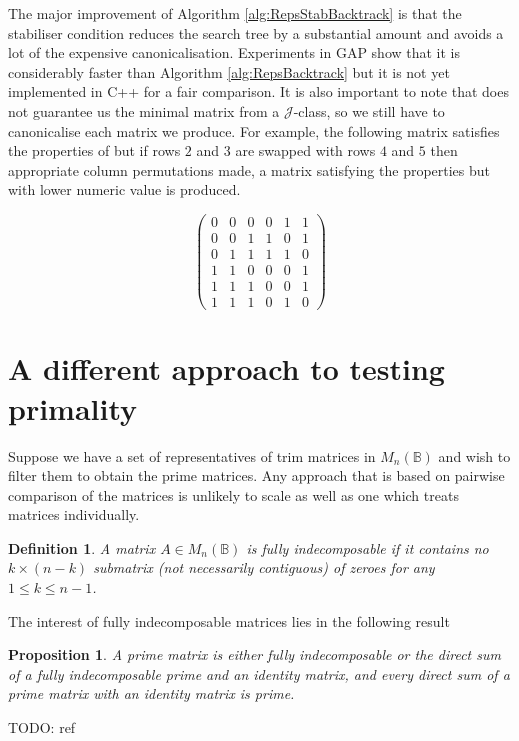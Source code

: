 \documentclass[11pt]{article}
\newtheorem{prop}[thm]{Proposition}
\newtheorem{defi}[thm]{Definition}
\numberwithin{equation}{section}
\newcommand{\B}{\mathbb{B}}
\newcommand{\Bn}{M_n(\B)}
\newcommand{\J}{\mathscr{J}}
\begin{document}
The major improvement of Algorithm \ref{alg:RepsStabBacktrack} is that the stabiliser condition reduces the search tree by a substantial amount and avoids a lot of the expensive canonicalisation.
Experiments in GAP show that it is considerably faster than Algorithm \ref{alg:RepsBacktrack} but it is not yet implemented in C++ for a fair comparison.
It is also important to note that  does not guarantee us the minimal matrix from a $\J$-class, so we still have to canonicalise each matrix we produce. For example, the following matrix satisfies the properties of  but if rows $2$ and $3$ are swapped with rows $4$ and $5$ then appropriate column permutations made, a matrix satisfying the properties but with lower numeric value is produced.

\[ 
  \begin{pmatrix}
    0 & 0 & 0 & 0 & 1 & 1 \\
    0 & 0 & 1 & 1 & 0 & 1 \\
    0 & 1 & 1 & 1 & 1 & 0 \\
    1 & 1 & 0 & 0 & 0 & 1 \\
    1 & 1 & 1 & 0 & 0 & 1 \\
    1 & 1 & 1 & 0 & 1 & 0
  \end{pmatrix}
\]

\section{A different approach to testing primality}
Suppose we have a set of representatives of trim matrices in $\Bn$ and wish to filter them to obtain the prime matrices. Any approach that is based on pairwise comparison of the matrices is unlikely to scale as well as one which treats matrices individually.\\

\begin{defi}
  A matrix $A \in \Bn$ is \emph{fully indecomposable} if it contains no $k \times (n - k)$ submatrix (not necessarily contiguous) of zeroes for any $1 \leq k \leq n- 1$.
\end{defi}

The interest of fully indecomposable matrices lies in the following result
\begin{prop}
  A prime matrix is either fully indecomposable or the direct sum of a fully indecomposable prime and an identity matrix, and every direct sum of a prime matrix with an identity matrix is prime.
\end{prop}
TODO: ref
\end{document}
